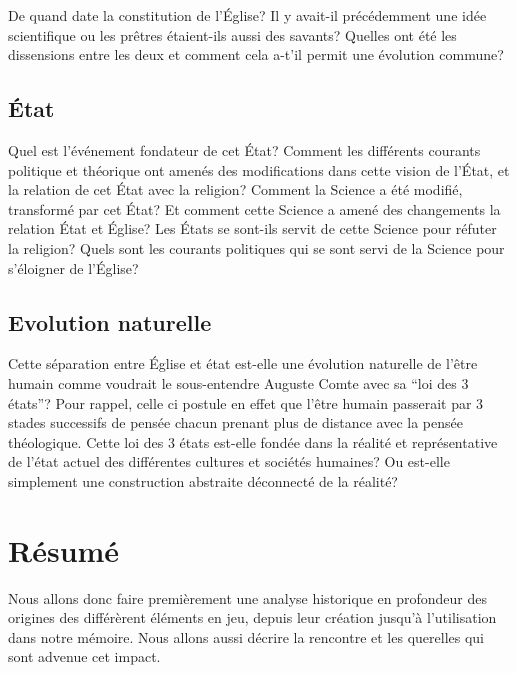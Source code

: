 \documentclass{article}
\begin{document}
De quand date la constitution de l'Église? Il y avait-il précédemment une idée
scientifique ou les prêtres étaient-ils aussi des savants? Quelles ont été les
dissensions entre les deux et comment cela a-t'il permit une évolution commune?

\subsection{État}

Quel est l'événement fondateur de cet État? Comment les différents courants
politique et théorique ont amenés des modifications dans cette vision de l'État,
et la relation de cet État avec la religion? Comment la Science a été modifié,
transformé par cet État? Et comment cette Science a amené des changements la
relation État et Église? Les États se sont-ils servit de cette Science pour
réfuter la religion? Quels sont les courants politiques qui se sont servi de la
Science pour s'éloigner de l'Église?

\subsection{Evolution naturelle}

Cette séparation entre Église et état est-elle une évolution naturelle
de l'être humain comme voudrait le sous-entendre Auguste Comte avec sa
``loi des 3 états''? Pour rappel, celle ci postule en effet que l'être humain
passerait par 3 stades successifs de pensée chacun prenant plus de
distance avec la pensée théologique. Cette loi des 3 états est-elle
fondée dans la réalité et représentative de l'état actuel des
différentes cultures et sociétés humaines? Ou est-elle simplement une
construction abstraite déconnecté de la réalité?

\section{Résumé}

Nous allons donc faire premièrement une analyse historique en profondeur des
origines des différèrent éléments en jeu, depuis leur création jusqu'à
l'utilisation dans notre mémoire. Nous allons aussi décrire la rencontre et les
querelles qui sont advenue cet impact.
\end{document}
